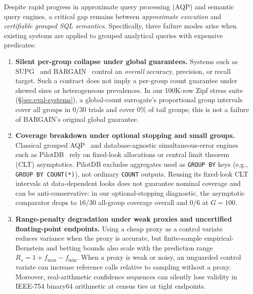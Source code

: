 Despite rapid progress in approximate query processing (AQP) and semantic query engines, a critical gap remains between \emph{approximate execution} and \emph{certifiable grouped SQL semantics}.
Specifically, three failure modes arise when existing systems are applied to grouped analytical queries with expensive predicates:
\begin{enumerate}
  \item \textbf{Silent per-group collapse under global guarantees.} Systems such as SUPG~\cite{kang2020supg} and BARGAIN~\cite{zeighami2026bargain} control an \emph{overall} accuracy, precision, or recall target. Such a contract does not imply a per-group count guarantee under skewed sizes or heterogeneous prevalences. In our 100K-row Zipf stress suite (\S\ref{sec:eval-systems}), a global-count surrogate's proportional group intervals cover all groups in $0/30$ trials and cover $0\%$ of tail groups; this is not a failure of BARGAIN's original global guarantee.
  \item \textbf{Coverage breakdown under optional stopping and small groups.} Classical grouped AQP~\cite{acharya2000congress,park2018verdict,walenz2019lws} and database-agnostic simultaneous-error engines such as PilotDB~\cite{zhu2025pilotdb} rely on fixed-look allocations or central limit theorem (CLT) asymptotics. PilotDB excludes aggregates used as \texttt{GROUP BY} keys (e.g., \texttt{GROUP BY COUNT(*)}), not ordinary \texttt{COUNT} outputs. Reusing its fixed-look CLT intervals at data-dependent looks does not guarantee nominal coverage and can be anti-conservative: in our optional-stopping diagnostic, the asymptotic comparator drops to $16/30$ all-group coverage overall and $0/6$ at $G=100$.
  \item \textbf{Range-penalty degradation under weak proxies and uncertified floating-point endpoints.} Using a cheap proxy as a control variate~\cite{kang2019blazeit,angelopoulos2023ppi,zhou2026celeus} reduces variance when the proxy is accurate, but finite-sample empirical-Bernstein and betting bounds also scale with the prediction range $R_s = 1 + f_{\max} - f_{\min}$. When a proxy is weak or noisy, an unguarded control variate can increase reference calls relative to sampling without a proxy. Moreover, real-arithmetic confidence sequences can silently lose validity in IEEE-754 binary64 arithmetic at census ties or tight endpoints.
\end{enumerate}

